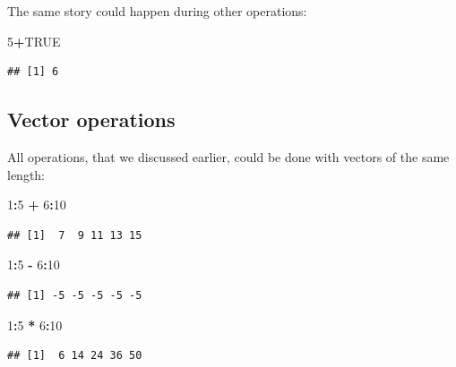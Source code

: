\documentclass[
]{book}
\newenvironment{Shaded}{\begin{snugshade}}{\end{snugshade}}
\newcommand{\DecValTok}[1]{\textcolor[rgb]{0.00,0.00,0.81}{#1}}
\newcommand{\OperatorTok}[1]{\textcolor[rgb]{0.81,0.36,0.00}{\textbf{#1}}}
\newcommand{\OtherTok}[1]{\textcolor[rgb]{0.56,0.35,0.01}{#1}}
\newcommand{\StringTok}[1]{\textcolor[rgb]{0.31,0.60,0.02}{#1}}
\begin{document}
The same story could happen during other operations:

\begin{Shaded}
\begin{Highlighting}[]
\DecValTok{5}\OperatorTok{+}\OtherTok{TRUE}
\end{Highlighting}
\end{Shaded}

\begin{verbatim}
## [1] 6
\end{verbatim}

\hypertarget{vector-operations}{%
\subsection{Vector operations}\label{vector-operations}}

All operations, that we discussed earlier, could be done with vectors of the same length:

\begin{Shaded}
\begin{Highlighting}[]
\DecValTok{1}\OperatorTok{:}\DecValTok{5} \OperatorTok{+}\StringTok{ }\DecValTok{6}\OperatorTok{:}\DecValTok{10}
\end{Highlighting}
\end{Shaded}

\begin{verbatim}
## [1]  7  9 11 13 15
\end{verbatim}

\begin{Shaded}
\begin{Highlighting}[]
\DecValTok{1}\OperatorTok{:}\DecValTok{5} \OperatorTok{-}\StringTok{ }\DecValTok{6}\OperatorTok{:}\DecValTok{10}
\end{Highlighting}
\end{Shaded}

\begin{verbatim}
## [1] -5 -5 -5 -5 -5
\end{verbatim}

\begin{Shaded}
\begin{Highlighting}[]
\DecValTok{1}\OperatorTok{:}\DecValTok{5} \OperatorTok{*}\StringTok{ }\DecValTok{6}\OperatorTok{:}\DecValTok{10}
\end{Highlighting}
\end{Shaded}

\begin{verbatim}
## [1]  6 14 24 36 50
\end{verbatim}
\end{document}
